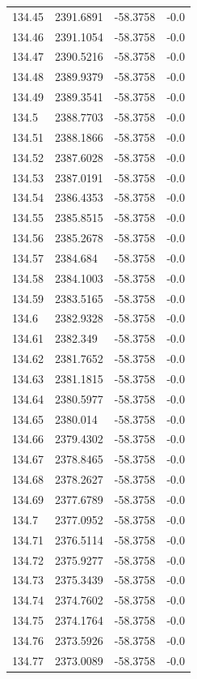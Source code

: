 \begin{table}[H]
\begin{tabular}{llll}
134.45 & 2391.6891 & -58.3758 & -0.0 \\
134.46 & 2391.1054 & -58.3758 & -0.0 \\
134.47 & 2390.5216 & -58.3758 & -0.0 \\
134.48 & 2389.9379 & -58.3758 & -0.0 \\
134.49 & 2389.3541 & -58.3758 & -0.0 \\
134.5 & 2388.7703 & -58.3758 & -0.0 \\
134.51 & 2388.1866 & -58.3758 & -0.0 \\
134.52 & 2387.6028 & -58.3758 & -0.0 \\
134.53 & 2387.0191 & -58.3758 & -0.0 \\
134.54 & 2386.4353 & -58.3758 & -0.0 \\
134.55 & 2385.8515 & -58.3758 & -0.0 \\
134.56 & 2385.2678 & -58.3758 & -0.0 \\
134.57 & 2384.684 & -58.3758 & -0.0 \\
134.58 & 2384.1003 & -58.3758 & -0.0 \\
134.59 & 2383.5165 & -58.3758 & -0.0 \\
134.6 & 2382.9328 & -58.3758 & -0.0 \\
134.61 & 2382.349 & -58.3758 & -0.0 \\
134.62 & 2381.7652 & -58.3758 & -0.0 \\
134.63 & 2381.1815 & -58.3758 & -0.0 \\
134.64 & 2380.5977 & -58.3758 & -0.0 \\
134.65 & 2380.014 & -58.3758 & -0.0 \\
134.66 & 2379.4302 & -58.3758 & -0.0 \\
134.67 & 2378.8465 & -58.3758 & -0.0 \\
134.68 & 2378.2627 & -58.3758 & -0.0 \\
134.69 & 2377.6789 & -58.3758 & -0.0 \\
134.7 & 2377.0952 & -58.3758 & -0.0 \\
134.71 & 2376.5114 & -58.3758 & -0.0 \\
134.72 & 2375.9277 & -58.3758 & -0.0 \\
134.73 & 2375.3439 & -58.3758 & -0.0 \\
134.74 & 2374.7602 & -58.3758 & -0.0 \\
134.75 & 2374.1764 & -58.3758 & -0.0 \\
134.76 & 2373.5926 & -58.3758 & -0.0 \\
134.77 & 2373.0089 & -58.3758 & -0.0 \\

\end{tabular}
\end{table}
